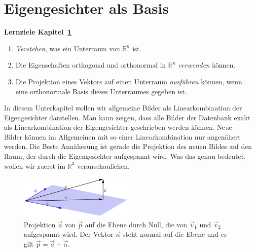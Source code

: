 \section{Eigengesichter als Basis} \label{sec:eigenbasis}
\begin{tcolorbox}
	\centerline{\textbf{Lernziele Kapitel~\ref{sec:eigenbasis}}}
	\begin{enumerate}[leftmargin=*,label=\thesection.\arabic*]
		\item \textit{Verstehen}, was ein Unterraum von $\mathbb R^n$ ist.
		\item Die Eigenschaften \glqq{}orthogonal\grqq{} und \glqq{}orthonormal\grqq{} in $\mathbb R^n$ \textit{verwenden} können.
		\item Die Projektion eines Vektors auf einen Unterraum \textit{ausführen} können, wenn eine orthonormale Basis dieses Unterraumes gegeben ist.
	\end{enumerate}
\end{tcolorbox}
In diesem Unterkapitel wollen wir allgemeine Bilder als Linearkombination der Eigengesichter darstellen.
Man kann zeigen, dass alle Bilder der Datenbank exakt als Linearkombination der Eigengesichter geschrieben werden können.
Neue Bilder können im Allgemeinen mit so einer Linearkombination nur angenähert werden.
Die Beste Annäherung ist gerade die Projektion des neuen Bildes auf den Raum, der durch die Eigengesichter aufgespannt wird.
Was das genau bedeutet, wollen wir zuerst im $\mathbb R^3$ veranschaulichen.
\begin{figure}[ht]
	\centering
	\includegraphics[width=0.5\textwidth]{images/projection}
	\caption{Projektion $\vec a$ von $\vec p$ auf die Ebene durch Null, die von $\vec v_1$ und $\vec v_2$ aufgespannt wird. Der Vektor $\vec n$ steht normal auf die Ebene und es gilt $\vec p=\vec a+\vec n$.}
	\label{fig:projection}
\end{figure}
